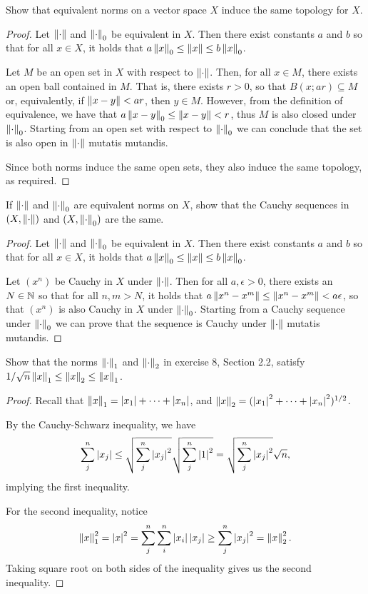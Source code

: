 \begin{exercise}{4}
Show that equivalent norms on a vector space $X$ induce the same topology for $X$.
\end{exercise}
\begin{proof}
Let $\left\lVert \cdot\right\rVert$ and $\left\lVert \cdot\right\rVert_0$ be equivalent in $X$. Then there exist constants $a$ and $b$ so that for all $x\in X$, it holds that $a\left\lVert x\right\rVert_0 \leq\left\lVert x\right\rVert \leq b\left\lVert x\right\rVert_0$.

Let $M$ be an open set in $X$ with respect to $\left\lVert \cdot\right\rVert$. Then, for all $x\in M$, there exists an open ball contained in $M$. That is, there exists $r>0$, so that $B(x;ar)\subseteq M$ or, equivalently, if $\left\lVert x-y\right\rVert<ar$, then $y\in M$. However, from the definition of equivalence, we have that $a\left\lVert x-y\right\rVert_0 \leq\left\lVert x-y\right\rVert <r$, thus $M$ is also closed under $\left\lVert \cdot\right\rVert_0$. Starting from an open set with respect to $\left\lVert \cdot\right\rVert_0$ we can conclude that the set is also open in $\left\lVert \cdot\right\rVert$ mutatis mutandis.

Since both norms induce the same open sets, they also induce the same topology, as required.
\end{proof}

\begin{exercise}{5}
If $\left\lVert \cdot\right\rVert$ and $\left\lVert \cdot\right\rVert_0$ are equivalent norms on $X$, show that the Cauchy sequences in $(X,\left\lVert \cdot\right\rVert)$ and $(X,\left\lVert \cdot\right\rVert_0)$ are the same.
\end{exercise}
\begin{proof}
Let $\left\lVert \cdot\right\rVert$ and $\left\lVert \cdot\right\rVert_0$ be equivalent in $X$. Then there exist constants $a$ and $b$ so that for all $x\in X$, it holds that $a\left\lVert x\right\rVert_0 \leq\left\lVert x\right\rVert \leq b\left\lVert x\right\rVert_0$.

Let $(x^n)$ be Cauchy in $X$ under $\left\lVert \cdot\right\rVert$. Then for all $a,\epsilon>0$, there exists an $N\in\mathbb{N}$ so that for all $n,m>N$, it holds that $a\left\lVert x^n-x^m\right\rVert\leq\left\lVert x^n-x^m\right\rVert<a\epsilon$, so that $(x^n)$ is also Cauchy in $X$ under $\left\lVert \cdot\right\rVert_0$. Starting from a Cauchy sequence under $\left\lVert \cdot\right\rVert_0$ we can prove that the sequence is Cauchy under $\left\lVert \cdot\right\rVert$ mutatis mutandis.
\end{proof}

\begin{exercise}{8}
Show that the norms $\left\lVert \cdot\right\rVert_1$ and $\left\lVert \cdot\right\rVert_2$ in exercise 8, Section 2.2, satisfy $1/\sqrt{n}\left\lVert x\right\rVert_1\leq\left\lVert x\right\rVert_2\leq\left\lVert x\right\rVert_1$.
\end{exercise}
\begin{proof}
Recall that $\left\lVert x\right\rVert_1=\left\lvert x_1\right\rvert+\dots+\left\lvert x_n\right\rvert$, and $\left\lVert x\right\rVert_2=(\left\lvert x_1\right\rvert^2+\dots+\left\lvert x_n\right\rvert^2)^{1/2}$. 

By the Cauchy-Schwarz inequality, we have 
\[
\sum^n_j\left\lvert x_j\right\rvert\leq \sqrt{\sum^n_j\left\lvert x_j\right\rvert^2}\sqrt{\sum^n_j\left\lvert 1\right\rvert^2}=\sqrt{\sum^n_j\left\lvert x_j\right\rvert^2}\sqrt{n},
\]
implying the first inequality.

For the second inequality, notice
\[
\left\lVert x\right\rVert_1^2 = \left\lvert x\right\rvert^2 = \sum_j^n\sum_i^n\left\lvert x_i\right\rvert\left\lvert x_j\right\rvert\geq \sum_j^n\left\lvert x_j\right\rvert^2 = \left\lVert x\right\rVert_2^2.
\]
Taking square root on both sides of the inequality gives us the second inequality.
\end{proof}

